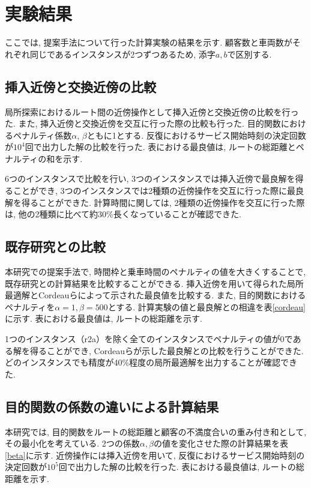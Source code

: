 \section{実験結果}
ここでは, 提案手法について行った計算実験の結果を示す.
顧客数と車両数がそれぞれ同じであるインスタンスが2つずつあるため, 添字$a,b$で区別する.

\subsection{挿入近傍と交換近傍の比較}
\label{sec:insert}
局所探索におけるルート間の近傍操作として挿入近傍と交換近傍の比較を行った. また, 挿入近傍と交換近傍を交互に行った際の比較も行った.
目的関数におけるペナルティ係数$\alpha$, $\beta$ともに1とする. 反復におけるサービス開始時刻の決定回数が$10^4$回で出力した解の比較を行った.
表における最良値は, ルートの総距離とペナルティの和を示す.


6つのインスタンスで比較を行い, 3つのインスタンスでは挿入近傍で最良解を得ることができ, 3つのインスタンスでは2種類の近傍操作を交互に行った際に最良解を得ることができた. 計算時間に関しては, 2種類の近傍操作を交互に行った際は, 他の2種類に比べて約30\%長くなっていることが確認できた.
\subsection{既存研究との比較}
\label{sec:cordeau}
本研究での提案手法で, 時間枠と乗車時間のペナルティの値を大きくすることで, 既存研究との計算結果を比較することができる. 挿入近傍を用いて得られた局所最適解とCordeauらによって示された最良値を比較する. また, 目的関数におけるペナルティを$\alpha=1, \beta=500$とする. 計算実験の値と最良解との相違を表\ref{cordeau}に示す. 表における最良値は, ルートの総距離を示す.

1つのインスタンス（r2a）を除く全てのインスタンスでペナルティの値が0である解を得ることができ, Cordeauらが示した最良解との比較を行うことができた.
どのインスタンスでも精度が40\%程度の局所最適解を出力することが確認できた.

\subsection{目的関数の係数の違いによる計算結果}
本研究では, 目的関数をルートの総距離と顧客の不満度合いの重み付き和として, その最小化を考えている. 2つの係数$\alpha, \beta$の値を変化させた際の計算結果を表\ref{beta}に示す. 近傍操作には挿入近傍を用いて, 反復におけるサービス開始時刻の決定回数が$10^5$回で出力した解の比較を行った. 表における最良値は, ルートの総距離を示す.


